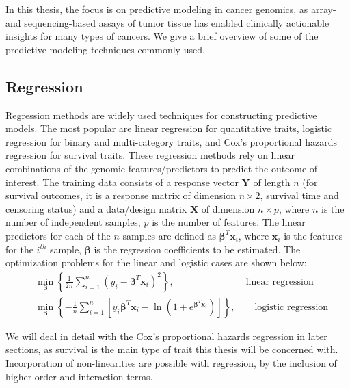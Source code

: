 In this thesis, the focus is on predictive modeling in cancer genomics, as array- and sequencing-based assays of tumor tissue has enabled clinically actionable insights for many types of cancers. We give a brief overview of some of the predictive modeling techniques commonly used. 


\subsection{Regression}
Regression methods are widely used techniques for constructing predictive models. The most popular are linear regression for quantitative traits, logistic regression for binary and multi-category traits, and Cox's proportional hazards regression for survival traits. These regression methods rely on linear combinations of the genomic features/predictors to predict the outcome of interest. The training data consists of a response vector $\bm{Y}$ of length $n$ (for survival outcomes, it is a response matrix of dimension $n \times 2$, survival time and censoring status) and a data/design matrix $\bm{X}$ of dimension $n \times p$, where $n$ is the number of independent samples, $p$ is the number of features. The linear predictors for each of the $n$ samples are defined as $\bm{\beta}^T\bm{x}_i$, where $\bm{x}_i$ is the features for the $i^{th}$ sample, $\bm{\beta}$ is the regression coefficients to be estimated. The optimization problems for the linear and logistic cases are shown below:
\begin{align}
    &\min_{\bm{\beta}} \left\{\frac{1}{2n} \sum_{i=1}^{n} (y_i-\bm{\beta}^T\bm{x}_i)^2 \right\}, \qquad\qquad\qquad\quad\;\: \text{linear regression} \label{eq1.1} \\
    &\min_{\bm{\beta}} \left\{-\frac{1}{n} \sum_{i=1}^{n} \left[y_i\bm{\beta}^T\bm{x}_i-\ln(1+e^{\bm{\beta}^T\bm{x}_i})\right]\right\}, \qquad \text{logistic regression} \label{eq1.2}
\end{align}

We will deal in detail with the Cox's proportional hazards regression in later sections, as survival is the main type of trait this thesis will be concerned  with. Incorporation of non-linearities are possible with regression, by the inclusion of higher order and interaction terms.

